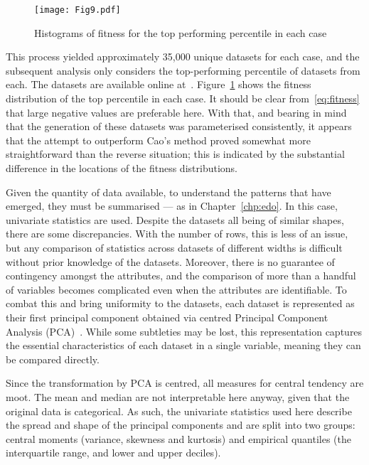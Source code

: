 \begin{figure}
    \centering
    \texttt{[image: Fig9.pdf]}
    \caption{%
        Histograms of fitness for the top performing percentile in each case
    }\label{fig:fitness}
\end{figure}

This process yielded approximately 35,000 unique datasets for each case, and the
subsequent analysis only considers the top-performing percentile of datasets
from each. The datasets are available online at~.
Figure~\ref{fig:fitness} shows the fitness distribution of the top
percentile in each case. It should be clear from~\eqref{eq:fitness} that large
negative values are preferable here. With that, and bearing in mind that the
generation of these datasets was parameterised consistently, it appears that the
attempt to outperform Cao's method proved somewhat more straightforward than
the reverse situation; this is indicated by the substantial difference in the
locations of the fitness distributions.

Given the quantity of data available, to understand the patterns that have
emerged, they must be summarised --- as in Chapter~\ref{chp:edo}. In this case,
univariate statistics are used. Despite the datasets all being of similar
shapes, there are some discrepancies. With the number of rows, this is less of
an issue, but any comparison of statistics across datasets of different widths
is difficult without prior knowledge of the datasets. Moreover, there is no
guarantee of contingency amongst the attributes, and the comparison of more than
a handful of variables becomes complicated even when the attributes are
identifiable. To combat this and bring uniformity to the datasets, each dataset
is represented as their first principal component obtained via centred Principal
Component Analysis (PCA)~\cite{Jolliffe1986}. While some subtleties may be lost,
this representation captures the essential characteristics of each dataset in a
single variable, meaning they can be compared directly.

Since the transformation by PCA is centred, all measures for central tendency
are moot. The mean and median are not interpretable here anyway, given that the
original data is categorical. As such, the univariate statistics used here
describe the spread and shape of the principal components and are split into
two groups: central moments (variance, skewness and kurtosis) and empirical
quantiles (the interquartile range, and lower and upper deciles).

